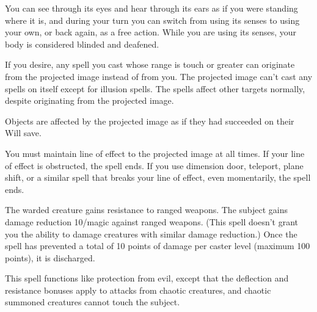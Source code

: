 \begin{multicols}{2}
\begin{small}
\smallskip\noindent You can see through its eyes and hear through its ears as if you were standing where it is, and during your turn you can switch from using its senses to using your own, or back again, as a free action. While you are using its senses, your body is considered blinded and deafened.

\smallskip\noindent If you desire, any spell you cast whose range is touch or greater can originate from the projected image instead of from you. The projected image can't cast any spells on itself except for illusion spells. The spells affect other targets normally, despite originating from the projected image.

\smallskip\noindent Objects are affected by the projected image as if they had succeeded on their Will save.

\smallskip\noindent You must maintain line of effect to the projected image at all times. If your line of effect is obstructed, the spell ends. If you use dimension door, teleport, plane shift, or a similar spell that breaks your line of effect, even momentarily, the spell ends.


\noindent The warded creature gains resistance to ranged weapons. The subject gains damage reduction 10/magic against ranged weapons. (This spell doesn't grant you the ability to damage creatures with similar damage reduction.) Once the spell has prevented a total of 10 points of damage per caster level (maximum 100 points), it is discharged.


\noindent This spell functions like protection from evil, except that the deflection and resistance bonuses apply to attacks from chaotic creatures, and chaotic summoned creatures cannot touch the subject.


\end{small}
\end{multicols}
